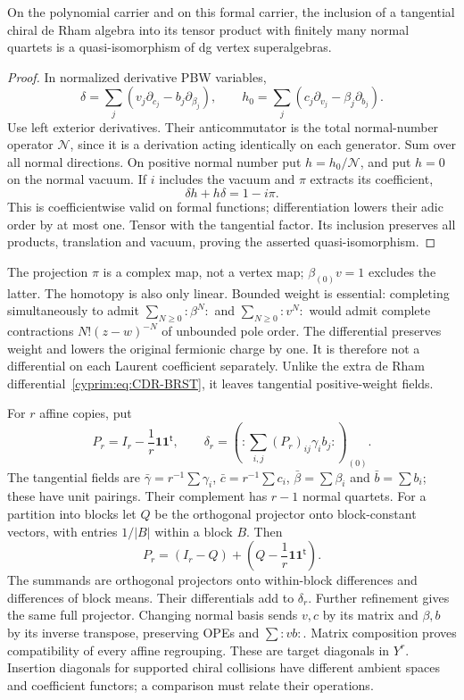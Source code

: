 \begin{proposition}\label{cyprim:prop:normal-contraction}
On the polynomial carrier and on this formal
carrier, the inclusion of a tangential chiral
de Rham algebra into its tensor product with
finitely many normal quartets is a
quasi-isomorphism of dg vertex superalgebras.
\end{proposition}

\begin{proof}
In normalized derivative PBW variables,
\[
 \delta=\sum_j(v_j\partial_{c_j}-b_j\partial_{\beta_j}),
 \qquad
 h_0=\sum_j(c_j\partial_{v_j}-\beta_j\partial_{b_j}).
\]
Use left exterior derivatives. Their anticommutator
is the total normal-number operator $\mathcal N$,
since it is a derivation acting identically on
each generator. Sum over all normal directions.
On positive normal number put $h=h_0/\mathcal N$,
and put $h=0$ on the normal vacuum. If $i$ includes
the vacuum and $\pi$ extracts its coefficient,
\[
 \delta h+h\delta=1-i\pi.
\]
This is coefficientwise valid on formal functions;
differentiation lowers their adic order by at
most one. Tensor with the tangential factor.
Its inclusion preserves all products, translation
and vacuum, proving the asserted quasi-isomorphism.
\end{proof}

The projection $\pi$ is a complex map, not a
vertex map; $\beta_{(0)}v=1$ excludes the latter.
The homotopy is also only linear. Bounded weight
is essential: completing simultaneously to admit
$\sum_{N\ge0}:\beta^N:$ and $\sum_{N\ge0}:v^N:$
would admit complete contractions
$N!(z-w)^{-N}$ of unbounded pole order.
The differential preserves weight and lowers
the original fermionic charge by one. It is
therefore not a differential on each Laurent
coefficient separately. Unlike the extra de
Rham differential~\eqref{cyprim:eq:CDR-BRST},
it leaves tangential positive-weight fields.

For $r$ affine copies, put
\[
 P_r=I_r-\frac1r\mathbf1\mathbf1^{\mathsf t},
 \qquad
 \delta_r=\left(:\sum_{i,j}(P_r)_{ij}\gamma_i b_j:\right)_{(0)}.
\]
The tangential fields are
$\bar\gamma=r^{-1}\sum\gamma_i$,
$\bar c=r^{-1}\sum c_i$,
$\bar\beta=\sum\beta_i$ and $\bar b=\sum b_i$;
these have unit pairings. Their complement has
$r-1$ normal quartets.
For a partition into blocks let $Q$ be the
orthogonal projector onto block-constant vectors,
with entries $1/|B|$ within a block $B$. Then
\begin{equation}\label{cyprim:eq:diagonal-regrouping}
 P_r=(I_r-Q)+
       \left(Q-\frac1r\mathbf1\mathbf1^{\mathsf t}\right).
\end{equation}
The summands are orthogonal projectors onto
within-block differences and differences of
block means. Their differentials add to
$\delta_r$. Further refinement gives the same
full projector. Changing normal basis sends
$v,c$ by its matrix and $\beta,b$ by its inverse
transpose, preserving OPEs and $\sum:vb:$.
Matrix composition proves compatibility of
every affine regrouping.
These are target diagonals in $Y^r$. Insertion
diagonals for supported chiral collisions have
different ambient spaces and coefficient functors;
a comparison must relate their operations.

